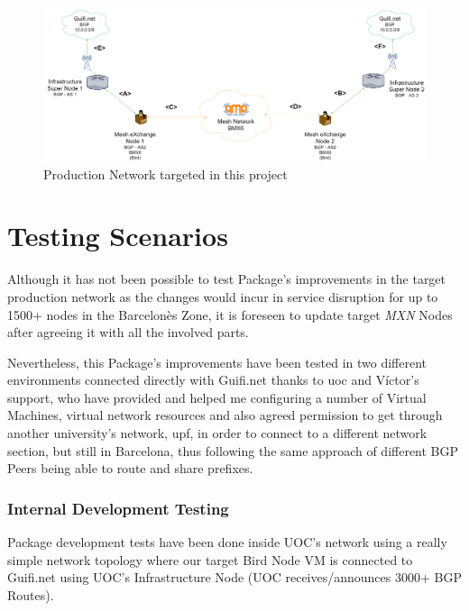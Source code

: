 \begin{landscape}

\begin{figure}[ht!]
    \centering
    \includegraphics[width=\hsize]{images/targetnet}
    \caption{Production Network targeted in this project}
    \label{fig:tarnet}
\end{figure}
\end{landscape}
\newpage

\section{Testing Scenarios}
Although it has not been possible to test Package's improvements in the target production network as the changes would incur in service disruption for up to 1500+ nodes in the Barcelon\`{e}s Zone, it is foreseen to update target \textit{MXN} Nodes after agreeing it with all the involved parts.

Nevertheless, this Package's improvements have been tested in two different environments connected directly with Guifi.net thanks to \acrlong{uoc} and V\'{i}ctor's support, who have provided and helped me configuring a number of Virtual Machines, virtual network resources and also agreed permission to get through another university's network, \acrlong{upf}, in order to connect to a different network section, but still in Barcelona, thus following the same approach of different BGP Peers being able to route and share prefixes. 

\subsubsection{Internal Development Testing}
Package development tests have been done inside UOC's network using a really simple network topology where our target Bird Node VM is connected to Guifi.net using UOC's Infrastructure Node (UOC receives/announces 3000+ BGP Routes). 

